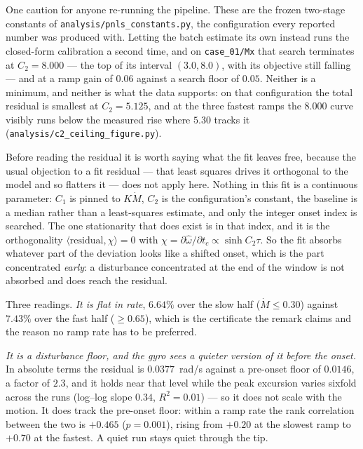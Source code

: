 \documentclass[10pt]{article}
\begin{document}
One caution for anyone re-running the pipeline. These are the frozen
two-stage constants of \texttt{analysis/pnls\_constants.py}, the
configuration every reported number was produced with. Letting the
batch estimate its own instead runs the closed-form calibration a
second time, and on \texttt{case\_01/Mx} that search terminates at
$C_2 = 8.000$ — the top of its interval $(3.0, 8.0)$, with its
objective still falling — and at a ramp gain of $0.06$ against a search
floor of $0.05$. Neither is a minimum, and neither is what the data
supports: on that configuration the total residual is smallest at
$C_2 = 5.125$, and at the three fastest ramps the $8.000$ curve visibly
runs below the measured rise where $5.30$ tracks it
(\texttt{analysis/c2\_ceiling\_figure.py}).

Before reading the residual it is worth saying what the fit leaves free,
because the usual objection to a fit residual — that least squares
drives it orthogonal to the model and so flatters it — does not apply
here. Nothing in this fit is a continuous parameter: $C_1$ is pinned to
$K\dot M$, $C_2$ is the configuration's constant, the baseline is a
median rather than a least-squares estimate, and only the integer onset
index is searched. The one stationarity that does exist is in that
index, and it is the orthogonality
$\langle \text{residual}, \chi\rangle = 0$ with
$\chi = \partial\hat\omega/\partial t_c \propto \sinh C_2\tau$. So the
fit absorbs whatever part of the deviation looks like a shifted onset,
which is the part concentrated \emph{early}: a disturbance concentrated
at the end of the window is not absorbed and does reach the residual.

Three readings. \emph{It is flat in rate}, $6.64\%$ over the slow half
($\dot M \le 0.30$) against $7.43\%$ over the fast half ($\ge 0.65$),
which is the certificate the remark claims and the reason no ramp rate
has to be preferred.

\emph{It is a disturbance floor, and the gyro sees a quieter version of
it before the onset.} In absolute terms the residual is $0.0377$~rad/s
against a pre-onset floor of $0.0146$, a factor of $2.3$, and it holds
near that level while the peak excursion varies sixfold across the runs
(log--log slope $0.34$, $R^2 = 0.01$) — so it does not scale with the
motion. It does track the pre-onset floor: within a ramp rate the rank
correlation between the two is $+0.465$ ($p = 0.001$), rising from
$+0.20$ at the slowest ramp to $+0.70$ at the fastest. A quiet run
stays quiet through the tip.
\end{document}
